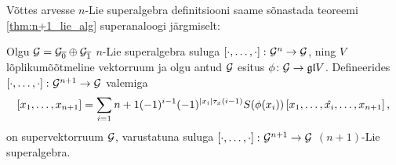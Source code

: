 Võttes arvesse $n$-Lie superalgebra definitsiooni saame sõnastada 
teoreemi \ref{thm:n+1_lie_alg} superanaloogi järgmiselt:

\begin{thm}
    Olgu $\mathcal{G} = \mathcal{G}_{\overline{0}} \oplus \mathcal{G}_{\overline{1}}$
    $n$-Lie superalgebra suluga $\left[ \cdot, \dots, \cdot \right] \colon \mathcal{G}^n \to \mathcal{G}$,
    ning $V$ lõplikumõõtmeline vektorruum ja olgu
    antud $\mathcal{G}$ esitus $\phi \colon \mathcal{G} \to \mathfrak{gl} V$. Defineerides
    $\left[ \cdot, \dots, \cdot \right] \colon \mathcal{G}^{n+1} \to \mathcal{G}$ valemiga
    \[
        \left[ x_1, \dots, x_{n+1} \right] = \sum_{i=1}{n+1}
        (-1)^{i-1} (-1)^{|x_i| \tau_x (i-1)} S(\phi(x_i))
        \left[ x_1, \dots, \hat{x_i}, \dots, x_{n+1} \right],
    \]
    on supervektorruum $\mathcal{G}$, varustatuna suluga
    $\left[ \cdot, \dots, \cdot \right] \colon \mathcal{G}^{n+1} \to \mathcal{G}$ $(n+1)$-Lie
    superalgebra.
\end{thm}
